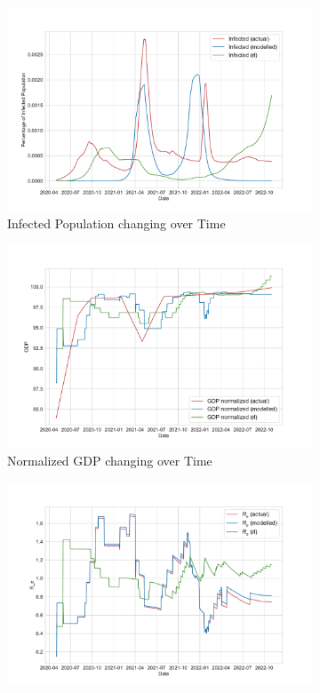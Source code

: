 \documentclass[tikz,fleqn,12pt]{wlscirep}
\begin{document}
\begin{figure}[htbp!]
\begin{subfigure}[t]{0.48\textwidth}
    \centering
    \includegraphics[width=\linewidth]{images/176647/rl_i.pdf}
    \caption{Infected Population changing over Time}
  \end{subfigure}
  \label{fig:176647_rl_i}
  \hfill
  \begin{subfigure}[t]{0.48\textwidth}
    \centering
    \includegraphics[width=\linewidth]{images/176647/rl_gdp.pdf}
    \caption{Normalized GDP changing over Time}
  \end{subfigure}
  \label{fig:176647_rl_gdp}
  \hfill
  \begin{subfigure}[t]{0.48\textwidth}
    \centering
    \includegraphics[width=\linewidth]{images/176647/rl_r_eff.pdf}

\end{subfigure}
\end{figure}
\end{document}
